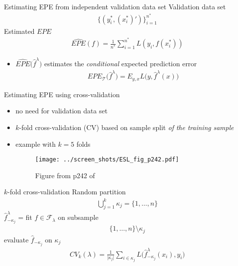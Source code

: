 \documentclass[xcolor=dvipsnames, handout]{beamer}
\begin{document}
\begin{frame}{Estimating EPE from independent validation data set}
Validation data set 
\begin{align*}
  \{(y^*_i, (x_i^*)')\}_{i=1}^{n^*}
\end{align*}
Estimated $EPE$
\begin{align*}
  \widehat{EPE}\left(f\right) = \frac{1}{n^*} \sum_{i=1}^{n^*} L\left(y_i, f(x^*_i)\right)   
\end{align*}
\begin{itemize}
  \item $\widehat{EPE}\big(\hat{f}^{\lambda}\big)$ estimates the \emph{conditional} expected prediction error
  \begin{align*}
    EPE_{\mathcal{T}} \big(\hat{f}^{\lambda}\big) = E_{y, x} L \big(y, \hat{f}^{\lambda}(x) \big)
  \end{align*}
\end{itemize}
\end{frame}


\begin{frame}{Estimating EPE using cross-validation}
\begin{itemize}
  \item no need for validation data set
  \item $k$-fold cross-validation (CV) based on sample split \emph{of the training sample}
  \item example with $k=5$ folds
  \begin{figure}
  \texttt{[image: ../screen\_shots/ESL\_fig\_p242.pdf]}
   \caption{Figure from p242 of \textcite{hastie2009elements}}
\end{figure}
\end{itemize}
\end{frame}

\begin{frame}{$k$-fold cross-validation}
Random partition
\begin{align*}
\bigcup_{j = 1}^k \kappa_j = \{1, \dotsc, n\}
\end{align*}
$\hat{f}^{\lambda}_{-\kappa_j}$ = fit $f \in \mathcal{F}_{\lambda}$ on subsample 
\begin{align*}
  \{1, \dotsc, n\} \setminus \kappa_j
\end{align*}
evaluate $\hat{f}_{-\kappa_j}$ on $\kappa_j$
\begin{align*}
  CV_k(\lambda) = \frac{1}{\lvert\kappa_j\rvert} \sum_{i \in \kappa_j} L\big(\hat{f}^{\lambda}_{-\kappa_j}(x_i), y_i \big)
\end{align*}
\end{frame}
\end{document}
